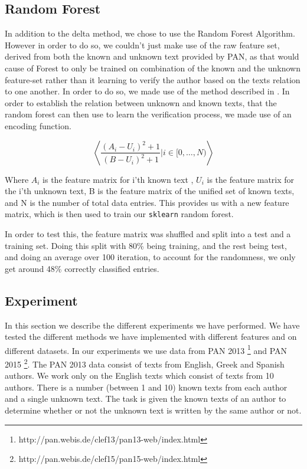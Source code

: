 \subsection{Random Forest}
In addition to the delta method, we chose to use the Random Forest Algorithm.
However in order to do so, we couldn't just make use of the raw feature set,
derived from both the known and unknown text provided by PAN, as that would
cause of Forest to only be trained on combination of the known and the unknown
feature-set rather than it learning to verify the author based on the texts
relation to one another. In order to do so, we made use of the method described
in \cite{pacheco2015}. In order to establish the relation between unknown and
known texts, that the random forest can then use to learn the verification
process, we made use of an encoding function.

$$
\left\langle \dfrac{(A_i-U_i)^2+1}{(B-U_i)^2+1}|i \in [0,\dots, N)\right\rangle
$$

Where $A_i$ is the feature matrix for i'th known text , $U_i$ is the feature
matrix for the i'th unknown text, B is the feature matrix of the unified set of
known texts, and N is the number of total data entries. This provides us with
a new feature matrix, which is then used to train our \texttt{sklearn} random
forest.

In order to test this, the feature matrix was shuffled and split into a test and
a training set. Doing this split with 80\% being training, and the rest being
test, and doing an average over 100 iteration, to account for the randomness, we
only get around 48\% correctly classified entries.

\subsection{Experiment}
In this section we describe the different experiments we have performed.
We have tested the different methods we have implemented with different
features and on different datasets. In our experiments we use data from PAN
2013 \footnote{http://pan.webis.de/clef13/pan13-web/index.html} and PAN 2015
\footnote{http://pan.webis.de/clef15/pan15-web/index.html}. The PAN 2013 data
consist of texts from English, Greek and Spanish authors. We work only on the
English texts which consist of texts from 10 authors. There is a number (between
1 and 10) known texts from each author and a single unknown text. The task is
given the known texts of an author to determine whether or not the unknown text
is written by the same author or not.

